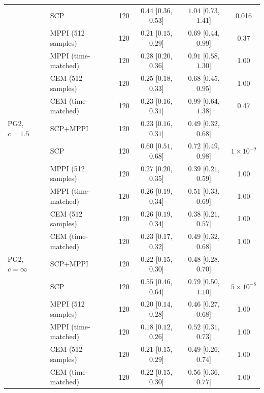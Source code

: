 \begin{tabular}{llrccc}
 & SCP & 120 & $0.44$ [$0.36$, $0.53$] & $1.04$ [$0.73$, $1.41$] & 0.016 \\
 & MPPI (512 samples) & 120 & $0.21$ [$0.15$, $0.29$] & $0.69$ [$0.44$, $0.99$] & 0.37 \\
 & MPPI (time-matched) & 120 & $0.28$ [$0.20$, $0.36$] & $0.91$ [$0.58$, $1.30$] & 1.00 \\
 & CEM (512 samples) & 120 & $0.25$ [$0.18$, $0.33$] & $0.68$ [$0.45$, $0.95$] & 1.00 \\
 & CEM (time-matched) & 120 & $0.23$ [$0.16$, $0.31$] & $0.99$ [$0.64$, $1.38$] & 0.47 \\
\midrule
PG2, $c=1.5$ & SCP+MPPI & 120 & $0.23$ [$0.16$, $0.31$] & $0.49$ [$0.32$, $0.68$] &  \\
 & SCP & 120 & $0.60$ [$0.51$, $0.68$] & $0.72$ [$0.49$, $0.98$] & $1\times 10^{-9}$ \\
 & MPPI (512 samples) & 120 & $0.27$ [$0.20$, $0.35$] & $0.39$ [$0.21$, $0.59$] & 1.00 \\
 & MPPI (time-matched) & 120 & $0.26$ [$0.19$, $0.34$] & $0.51$ [$0.33$, $0.69$] & 1.00 \\
 & CEM (512 samples) & 120 & $0.26$ [$0.19$, $0.34$] & $0.38$ [$0.21$, $0.57$] & 1.00 \\
 & CEM (time-matched) & 120 & $0.23$ [$0.17$, $0.32$] & $0.49$ [$0.32$, $0.68$] & 1.00 \\
\midrule
PG2, $c=\infty$ & SCP+MPPI & 120 & $0.22$ [$0.15$, $0.30$] & $0.48$ [$0.28$, $0.70$] &  \\
 & SCP & 120 & $0.55$ [$0.46$, $0.64$] & $0.79$ [$0.50$, $1.10$] & $5\times 10^{-8}$ \\
 & MPPI (512 samples) & 120 & $0.20$ [$0.14$, $0.28$] & $0.46$ [$0.27$, $0.68$] & 1.00 \\
 & MPPI (time-matched) & 120 & $0.18$ [$0.12$, $0.26$] & $0.52$ [$0.31$, $0.73$] & 1.00 \\
 & CEM (512 samples) & 120 & $0.21$ [$0.15$, $0.29$] & $0.49$ [$0.26$, $0.74$] & 1.00 \\
 & CEM (time-matched) & 120 & $0.22$ [$0.15$, $0.30$] & $0.56$ [$0.36$, $0.77$] & 1.00 \\
\bottomrule
\end{tabular}
